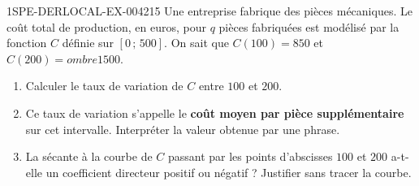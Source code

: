 \begin{exercice}{1SPE-DERLOCAL-EX-004}{2}{15}
Une entreprise fabrique des pièces mécaniques. Le coût total de production, en euros, pour $q$ pièces fabriquées est modélisé par la fonction $C$ définie sur $[0\,;\,500]$. On sait que $C(100)=850$ et $C(200)=
ombre{1500}$.

\begin{enumerate}
  \item Calculer le taux de variation de $C$ entre $100$ et $200$.
  \item Ce taux de variation s'appelle le \textbf{coût moyen par pièce supplémentaire} sur cet intervalle. Interpréter la valeur obtenue par une phrase.
  \item La sécante à la courbe de $C$ passant par les points d'abscisses $100$ et $200$ a-t-elle un coefficient directeur positif ou négatif ? Justifier sans tracer la courbe.
\end{enumerate}
\end{exercice}

